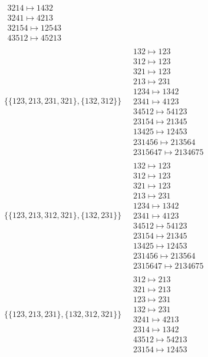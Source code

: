 \begin{scriptsize}
\begin{align}
\begin{matrix}
\\
3214 \mapsto 1432
\\
3241 \mapsto 4213
\\
32154 \mapsto 12543
\\
43512 \mapsto 45213
\end{matrix}
\\
\{\{123, 213, 231, 321\}, \{132, 312\}\}
\ 
&
\begin{matrix}
132 \mapsto 123
\\
312 \mapsto 123
\\
321 \mapsto 123
\\
213 \mapsto 231
\\
1234 \mapsto 1342
\\
2341 \mapsto 4123
\\
34512 \mapsto 54123
\\
23154 \mapsto 21345
\\
13425 \mapsto 12453
\\
231456 \mapsto 213564
\\
2315647 \mapsto 2134675
\end{matrix}
\\
\{\{123, 213, 312, 321\}, \{132, 231\}\}
\ 
&
\begin{matrix}
132 \mapsto 123
\\
312 \mapsto 123
\\
321 \mapsto 123
\\
213 \mapsto 231
\\
1234 \mapsto 1342
\\
2341 \mapsto 4123
\\
34512 \mapsto 54123
\\
23154 \mapsto 21345
\\
13425 \mapsto 12453
\\
231456 \mapsto 213564
\\
2315647 \mapsto 2134675
\end{matrix}
\\
\{\{123, 213, 231\}, \{132, 312, 321\}\}
\ 
&
\begin{matrix}
312 \mapsto 213
\\
321 \mapsto 213
\\
123 \mapsto 231
\\
132 \mapsto 231
\\
3241 \mapsto 4213
\\
2314 \mapsto 1342
\\
43512 \mapsto 54213
\\
23154 \mapsto 12453
\end{matrix}

\end{align}
\end{scriptsize}
